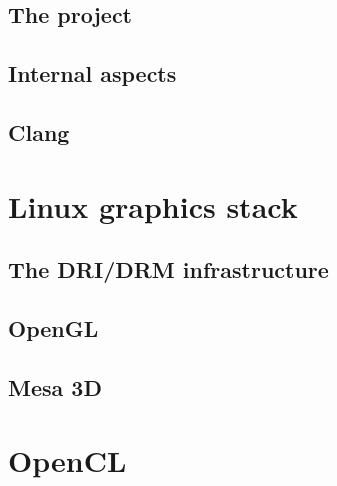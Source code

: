 \documentclass[12pt,a4paper,oneside]{article}
\begin{document}
\subsection{The project}
\subsection{Internal aspects}
\subsection{Clang}

\section{Linux graphics stack}
\subsection{The DRI/DRM infrastructure}
\subsection{OpenGL}
\subsection{Mesa 3D}

\section{OpenCL}
\end{document}
